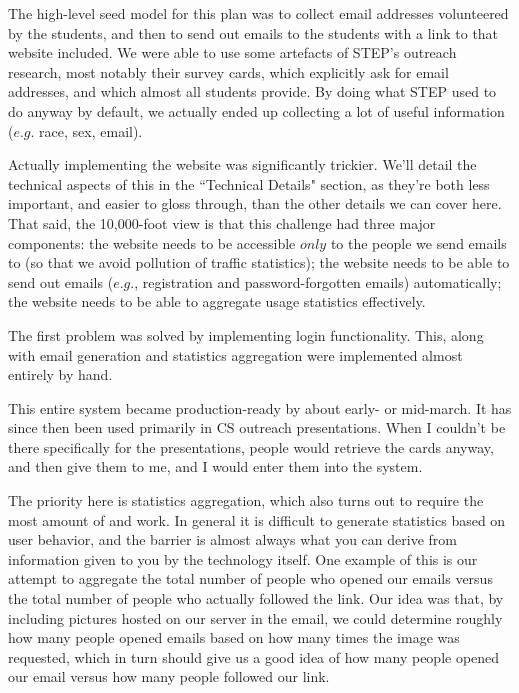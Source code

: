 \documentclass[11pt,a4paper]{article}
\begin{document}
The high-level seed model for this plan was to collect email addresses volunteered by the students, and then to send out emails to the students with a link to that website included.  We were able to use some artefacts of STEP's outreach research, most notably their survey cards, which explicitly ask for email addresses, and which almost all students provide. By doing what STEP used to do anyway by default, we actually ended up collecting a lot of useful information ($\textit{e.g.}$ race, sex, email).

Actually implementing the website was significantly trickier. We'll detail the technical aspects of this in the ``Technical Details" section, as they're both less important, and easier to gloss through, than the other details we can cover here. That said, the 10,000-foot view is that this challenge had three major components: the website needs to be accessible $\textit{only}$ to the people we send emails to (so that we avoid pollution of traffic statistics); the website needs to be able to send out emails ($\textit{e.g.}$, registration and password-forgotten emails) automatically; the website needs to be able to aggregate usage statistics effectively.

The first problem was solved by implementing login functionality. This, along with email generation and statistics aggregation were implemented almost entirely by hand.

This entire system became production-ready by about early- or mid-march. It has since then been used primarily in CS outreach presentations. When I couldn't be there specifically for the presentations, people would retrieve the cards anyway, and then give them to me, and I would enter them into the system.

The priority here is statistics aggregation, which also turns out to require the most amount of and work. In general it is difficult to generate statistics based on user behavior, and the barrier is almost always what you can derive from information given to you by the technology itself. One example of this is our attempt to aggregate the total number of people who opened our emails versus the total number of people who actually followed the link. Our idea was that, by including pictures hosted on our server in the email, we could determine roughly how many people opened emails based on how many times the image was requested, which in turn should give us a good idea of how many people opened our email versus how many people followed our link.
\end{document}
